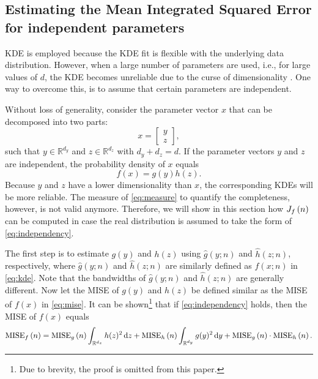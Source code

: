 \subsection{Estimating the Mean Integrated Squared Error for independent parameters}
\label{sec:mise independent}

KDE is employed because the KDE fit is flexible with the underlying data distribution. However, when a large number of parameters are used, i.e., for large values of $d$, the KDE becomes unreliable due to the curse of dimensionality \cite{scott2015multivariate}. One way to overcome this, is to assume that certain parameters are independent. 

Without loss of generality, consider the parameter vector $x$ that can be decomposed into two parts:
\begin{equation}
	\label{eq:combine}
	x = \begin{bmatrix}
		y \\ z
	\end{bmatrix},
\end{equation}
such that $y \in \mathbb{R}^{d_y}$ and $z \in \mathbb{R}^{d_z}$ with $d_y+d_z=d$. If the parameter vectors $y$ and $z$ are independent, the probability density of $x$ equals
\begin{equation}
	\label{eq:independency}
	f(x) = g(y) h(z).
\end{equation}
Because $y$ and $z$ have a lower dimensionality than $x$, the corresponding KDEs will be more reliable. The measure of \cref{eq:measure} to quantify the completeness, however, is not valid anymore. Therefore, we will show in this section how $J_{f} \left( n \right)$ can be computed in case the real distribution is assumed to take the form of \cref{eq:independency}.

The first step is to estimate $g(y)$ and $h(z)$ using $\hat{g}(y;n)$ and $\hat{h}(z;n)$, respectively, where $\hat{g}(y;n)$ and $\hat{h}(z;n)$ are similarly defined as $\hat{f}(x;n)$ in \cref{eq:kde}. Note that the bandwidths of $\hat{g}(y;n)$ and $\hat{h}(z;n)$ are generally different. Now let the MISE of $g(y)$ and $h(z)$ be defined similar as the MISE of $f(x)$ in \cref{eq:mise}. It can be shown\footnote{Due to brevity, the proof is omitted from this paper.} that if \cref{eq:independency} holds, then the MISE of $f(x)$ equals
\begin{dmath}
	\label{eq:mise independent}
	\mise{f}{n} = \mise{g}{n} \int_{\mathbb{R}^{d_z}} h(z)^2 \ud z + \mise{h}{n} \int_{\mathbb{R}^{d_y}} g(y)^2 \ud y + \mise{g}{n} \cdot \mise{h}{n}.
\end{dmath}

